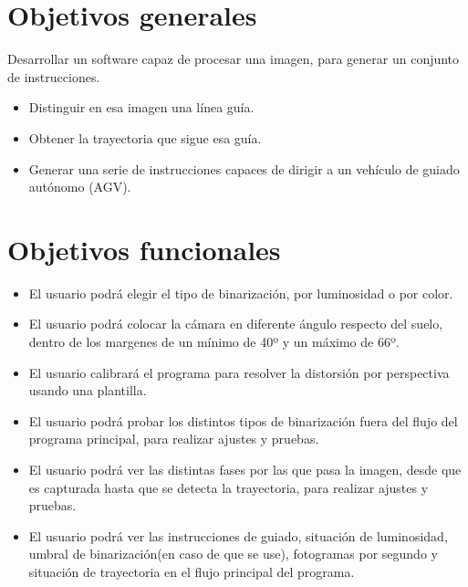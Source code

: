 
\section{Objetivos generales}
Desarrollar un software capaz de procesar una imagen, para generar un conjunto de instrucciones.

\begin{itemize}
	\item Distinguir en esa imagen una línea guía.
	
	\item Obtener la trayectoria que sigue esa guía.
	
	\item Generar una serie de instrucciones capaces de dirigir a un vehículo de guiado autónomo (AGV).
\end{itemize} 

\section{Objetivos funcionales}
\begin{itemize}
	\item El usuario podrá elegir el tipo de binarización, por luminosidad o por color.
	
	\item El usuario podrá colocar la cámara en diferente ángulo respecto del suelo, dentro de los margenes de un mínimo de 40º y un máximo de 66º.
	
	\item El usuario calibrará el programa para resolver la distorsión por perspectiva usando una plantilla.
	
	\item El usuario podrá probar los distintos tipos de binarización fuera del flujo del programa principal, para realizar ajustes y pruebas.
	
	\item El usuario podrá ver las distintas fases por las que pasa la imagen, desde que es capturada hasta que se detecta la trayectoria, para realizar ajustes y pruebas.
	
	\item El usuario podrá ver las instrucciones de guiado, situación de luminosidad, umbral de binarización(en caso de que se use), fotogramas por segundo y situación de trayectoria en el flujo principal del programa.
	
\end{itemize}


